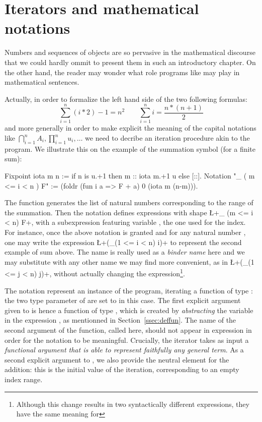\section{Iterators and mathematical notations}
\label{sec:bigopnat}

Numbers and sequences of objects are so pervasive in the mathematical
discourse that we could hardly ommit to present them in such an
introductory chapter. On the other hand, the reader may wonder what role
programs like  may play in mathematical sentences.

Actually, in order to formalize the left hand side of the two
following formulas:
$$
\sum_{i=1}^n (i * 2) - 1 = n ^ 2 \qquad
\sum_{i=1}^n i = \frac{n * (n + 1)}{2}
$$
and more generally in order to make explicit the meaning of the capital
notations like $\bigcap_{i=1}^nA_i,
\prod_{i=1}^nu_i, \dots$ we need to decribe an iteration procedure
akin to the  program. We illustrate this on the example of
the summation symbol (for a finite sum):

\begin{coq}{}{}
Fixpoint iota m n := if n is u.+1 then m :: iota m.+1 u else [::].
Notation "\sum_ ( m <= i < n ) F" :=
  (foldr (fun i a => F + a) 0 (iota m (n-m))).
\end{coq}
\index[coq]{\C{\\sum}}

The  function generates the list of natural numbers
corresponding to the range of the summation. Then the notation defines
expressions with shape \L+\sum_ (m <= i < n) F+, with  a
subexpression featuring variable , the one used for the
index. For instance, once the above notation is granted and for any
natural number , one may write
the \Coq{} expression \L+(\sum_(1 <= i < n) i)+ to represent the
second example of sum above. The name  is really used as a
\emph{binder name} here and we may substitute  with any other
name we may find more convenient, as in \L+(\sum_(1 <= j < n) j)+,
without actually changing the expression\footnote{Although this change
results in two syntactically different expressions, they have the same
meaning for \Coq{}}.

The notation represent an instance of the  program, iterating
a function of type : the two type parameter of
 are set to  in this case. The first explicit
argument given to  is hence a function of
type , which is created by \emph{abstracting} the
variable  in the expression , as mentionned in
Section~\ref{ssec:deffun}. The name of the second argument of the
function, called  here, should not appear in expression  in
order for the notation to be meaningful. Crucially, the 
iterator takes as
input a \emph{functional argument that is able to represent faithfully
  any general term}. As a second explicit argument to , we
also provide the neutral element  for the addition: this is the
initial value of the iteration, corresponding to an empty index range.

